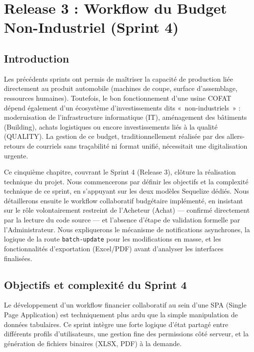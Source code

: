 \chapter{Release 3 : Workflow du Budget Non-Industriel (Sprint 4)}
\label{chap:sprint_4}

\section{Introduction}
Les précédents sprints ont permis de maîtriser la capacité de production liée directement au produit automobile (machines de coupe, surface d'assemblage, ressources humaines). Toutefois, le bon fonctionnement d'une usine COFAT dépend également d'un écosystème d'investissements dits «~non-industriels~» : modernisation de l'infrastructure informatique (IT), aménagement des bâtiments (Building), achats logistiques ou encore investissements liés à la qualité (QUALITY). La gestion de ce budget, traditionnellement réalisée par des allers-retours de courriels sans traçabilité ni format unifié, nécessitait une digitalisation urgente.

Ce cinquième chapitre, couvrant le Sprint 4 (Release 3), clôture la réalisation technique du projet. Nous commencerons par définir les objectifs et la complexité technique de ce sprint, en s'appuyant sur les deux modèles Sequelize dédiés. Nous détaillerons ensuite le workflow collaboratif budgétaire implémenté, en insistant sur le rôle volontairement restreint de l'Acheteur (Achat) — confirmé directement par la lecture du code source — et l'absence d'étape de validation formelle par l'Administrateur. Nous expliquerons le mécanisme de notifications asynchrones, la logique de la route \texttt{batch-update} pour les modifications en masse, et les fonctionnalités d'exportation (Excel/PDF) avant d'analyser les interfaces finalisées.

\section{Objectifs et complexité du Sprint 4}
Le développement d'un workflow financier collaboratif au sein d'une SPA (Single Page Application) est techniquement plus ardu que la simple manipulation de données tabulaires. Ce sprint intègre une forte logique d'état partagé entre différents profils d'utilisateurs, une gestion fine des permissions côté serveur, et la génération de fichiers binaires (XLSX, PDF) à la demande.

